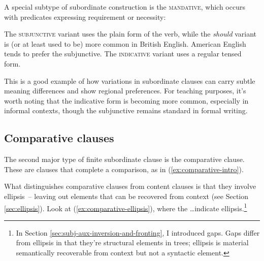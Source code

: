 A special subtype of subordinate construction is the \textsc{mandative}, which occurs with predicates expressing requirement or necessity:

\ea \label{ex:mandative}
    \z
\z

The \textsc{subjunctive} variant uses the plain form of the verb, while the \textit{should} variant is (or at least used to be) more common in British English. American English tends to prefer the subjunctive. The \textsc{indicative} variant uses a regular tensed form.

This is a good example of how variations in subordinate clauses can carry subtle meaning differences and show regional preferences. For teaching purposes, it's worth noting that the indicative form is becoming more common, especially in informal contexts, though the subjunctive remains standard in formal writing.

\subsection{Comparative clauses}

The second major type of finite subordinate clause is the comparative clause. These are clauses that complete a comparison, as in (\ref{ex:comparative-intro}).

\ea \label{ex:comparative-intro}
    \z
\z

What distinguishes comparative clauses from content clauses is that they involve ellipsis~-- leaving out elements that can be recovered from context (see Section \ref{sec:ellipsis}). Look at (\ref{ex:comparative-ellipsis}), where the \dots indicate ellipsis.\footnote{In Section \ref{sec:subj-aux-inversion-and-fronting}, I introduced gaps. Gaps differ from ellipsis in that they're structural elements in trees; ellipsis is material semantically recoverable from context but not a syntactic element.}

\ea \label{ex:comparative-ellipsis}
    \z
\z

